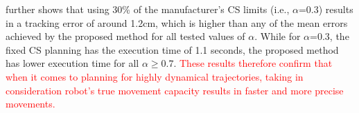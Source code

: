  further shows that using 30\% of the manufacturer's CS limits (i.e., $\alpha$=0.3) results in a tracking error of around 1.2cm, which is higher than any of the mean errors achieved by the proposed method for all tested values of $\alpha$.
While for $\alpha$=0.3, the fixed CS planning has the execution time of 1.1 seconds, the proposed method has lower execution time for all $\alpha\geq0.7$. 
\textcolor{red}{These results therefore confirm that when it comes to planning for highly dynamical trajectories, taking in consideration robot's true movement capacity results in faster and more precise movements. }







